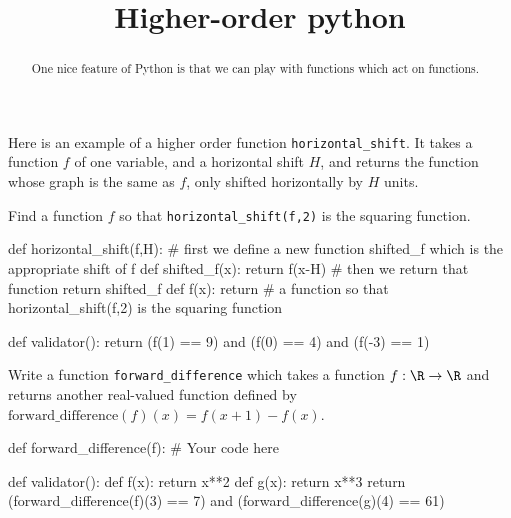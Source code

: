 \documentclass{ximera}
\title{Higher-order python}
\begin{document}
\begin{abstract}
  One nice feature of Python is that we can play with functions which act on functions.
\end{abstract}

\begin{question}
  Here is an example of a higher order function
  \verb|horizontal_shift|.  It takes a function $f$ of one variable,
  and a horizontal shift $H$, and returns the function whose graph is
  the same as $f$, only shifted horizontally by $H$ units.


  \begin{solution}
    Find a function $f$ so that \verb|horizontal_shift(f,2)| is the squaring function.
  
    \begin{python}
def horizontal_shift(f,H):
  # first we define a new function shifted_f which is the appropriate shift of f
  def shifted_f(x):  
    return f(x-H)
  # then we return that function
  return shifted_f
def f(x):
  return # a function so that horizontal_shift(f,2) is the squaring function

def validator():
  return (f(1) == 9) and (f(0) == 4) and (f(-3) == 1)
    \end{python}
  \end{solution}


  \begin{solution}
    Write a function \verb|forward_difference| which takes a function $f : \R \to \R$ and returns another real-valued function defined 
    by $\text{forward_difference}(f)(x) = f(x+1)-f(x)$.

    \begin{python}
def forward_difference(f):
  # Your code here

def validator():
  def f(x):
    return x**2
  def g(x):
    return x**3
  return (forward_difference(f)(3) == 7) and (forward_difference(g)(4) == 61)
    \end{python}
  \end{solution}
\end{question}
\end{document}
